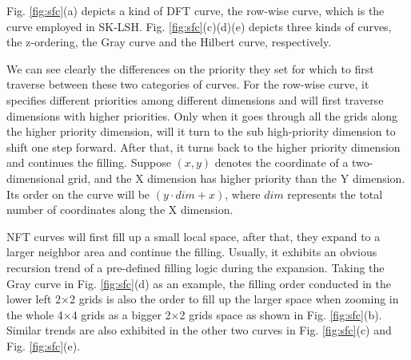 \documentclass[twocolumn]{svjour3}          %
\begin{document}
Fig. \ref{fig:sfc}(a) depicts a kind of DFT curve, the row-wise curve, which is the curve employed in SK-LSH. Fig. \ref{fig:sfc}(c)(d)(e) depicts three kinds of curves, the z-ordering, the Gray curve and the Hilbert curve, respectively.

We can see clearly the differences on the priority they set for which to first traverse between these two categories of curves. For the row-wise curve, it specifies different priorities among different dimensions and will first traverse dimensions with higher priorities. Only when it goes through all the grids along the higher priority dimension, will it turn to the sub high-priority dimension to shift one step forward. After that, it turns back to the higher priority dimension and continues the filling. Suppose $(x, y)$ denotes the coordinate of a two-dimensional grid, and the X dimension has higher priority than the Y dimension. Its order on the curve will be $(y \cdot dim + x)$, where $dim$ represents the total number of coordinates along the X dimension.

NFT curves will first fill up a small local space, after that, they expand to a larger neighbor area and continue the filling. Usually, it exhibits an obvious recursion trend of a pre-defined filling logic during the expansion. Taking the Gray curve in Fig. \ref{fig:sfc}(d) as an example, the filling order conducted in the lower left 2$\times$2 grids is also the order to fill up the larger space when zooming in the whole 4$\times$4 grids as a bigger 2$\times$2 grids space as shown in Fig. \ref{fig:sfc}(b). Similar trends are also exhibited in the other two curves in Fig. \ref{fig:sfc}(c) and Fig. \ref{fig:sfc}(e).
\end{document}
